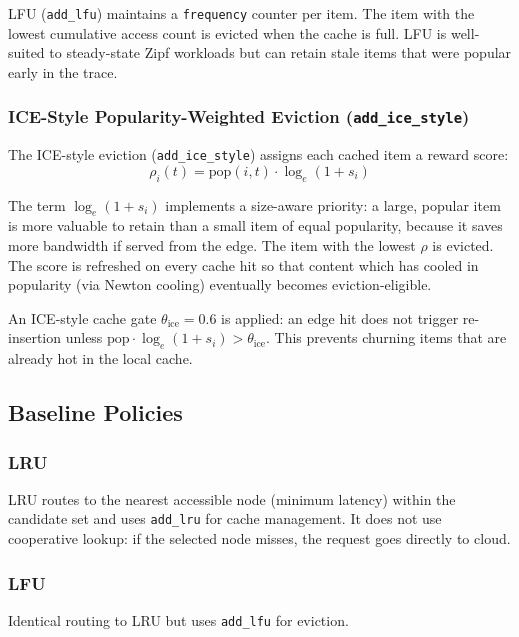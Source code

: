 \documentclass[12pt]{article}
\begin{document}
LFU (\texttt{add\_lfu}) maintains a \texttt{frequency} counter per item. The item with the lowest cumulative access count is evicted when the cache is full. LFU is well-suited to steady-state Zipf workloads but can retain stale items that were popular early in the trace.

\subsubsection{ICE-Style Popularity-Weighted Eviction (\texttt{add\_ice\_style})}

The ICE-style eviction (\texttt{add\_ice\_style}) assigns each cached item a reward score:
\begin{equation}
  \rho_i(t) = \text{pop}(i, t) \cdot \log_e(1 + s_i)
\end{equation}

The term $\log_e(1 + s_i)$ implements a size-aware priority: a large, popular item is more valuable to retain than a small item of equal popularity, because it saves more bandwidth if served from the edge. The item with the lowest $\rho$ is evicted. The score is refreshed on every cache hit so that content which has cooled in popularity (via Newton cooling) eventually becomes eviction-eligible.

An ICE-style cache gate $\theta_{\text{ice}} = 0.6$ is applied: an edge hit does not trigger re-insertion unless $\text{pop} \cdot \log_e(1 + s_i) > \theta_{\text{ice}}$. This prevents churning items that are already hot in the local cache.

\subsection{Baseline Policies}

\subsubsection{LRU}

LRU routes to the nearest accessible node (minimum latency) within the candidate set and uses \texttt{add\_lru} for cache management. It does not use cooperative lookup: if the selected node misses, the request goes directly to cloud.

\subsubsection{LFU}

Identical routing to LRU but uses \texttt{add\_lfu} for eviction.
\end{document}
